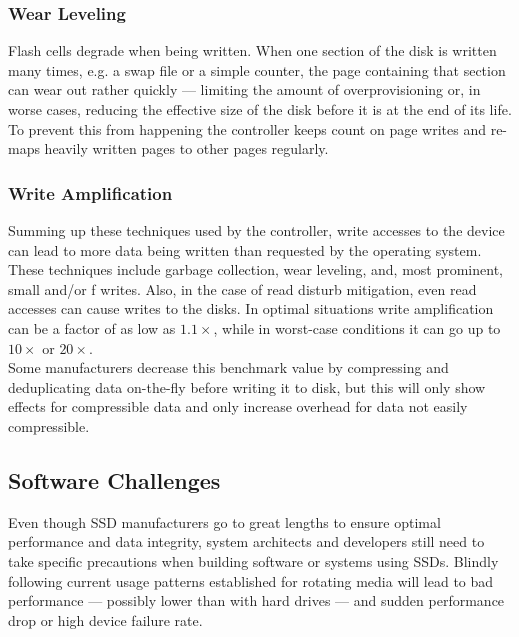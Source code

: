 \documentclass{acm_proc_article-sp}
\begin{document}
\subsubsection*{Wear Leveling}
Flash cells degrade when being written. When one section of the disk is written many times, e.g. a swap file or a simple counter, the page containing that section can wear out rather quickly --- limiting the amount of overprovisioning or, in worse cases, reducing the effective size of the disk before it is at the end of its life. To prevent this from happening the controller keeps count on page writes and re-maps heavily written pages to other pages regularly.

\subsubsection*{Write Amplification}
Summing up these techniques used by the controller, write accesses to the device can lead to more data being written than requested by the operating system. These techniques include garbage collection, wear leveling, and, most prominent, small and/or f writes.
Also, in the case of read disturb mitigation, even read accesses can cause writes to the disks.
In optimal situations write amplification can be a factor of as low as $1.1\times$, while in worst-case conditions it can go up to $10\times$ or $20\times$.
\\
Some manufacturers decrease this benchmark value by compressing and deduplicating data on-the-fly before writing it to disk, but this will only show effects for compressible data and only increase overhead for data not easily compressible.

\subsection{Software Challenges}
Even though SSD manufacturers go to great lengths to ensure optimal performance and data integrity, system architects and developers still need to take specific precautions when building software or systems using SSDs. Blindly following current usage patterns established for rotating media will lead to bad performance --- possibly lower than with hard drives --- and sudden performance drop or high device failure rate.
\end{document}
